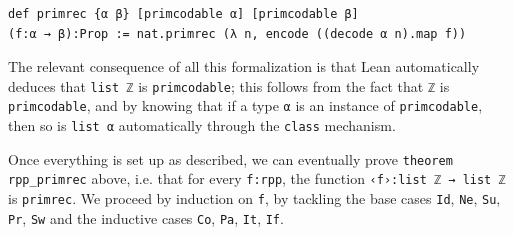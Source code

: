 \documentclass[preprint]{elsarticle}
\theoremstyle{remark}
\newcommand{\MATHLIB}{\textsf{mathlib}\xspace}
\newcommand{\LEAN}{\textsf{Lean}\xspace}
\begin{document}
\begin{lstlisting}
def primrec {α β} [primcodable α] [primcodable β]
(f:α → β):Prop := nat.primrec (λ n, encode ((decode α n).map f))
\end{lstlisting}

The relevant consequence of all this formalization is that \LEAN automatically deduces that \lstinline|list ℤ| is \lstinline|primcodable|; this follows from the fact that \lstinline|ℤ| is \lstinline|primcodable|, and by knowing that if a type \lstinline|α| is an instance of \lstinline|primcodable|, then so is \lstinline|list α| automatically through the \lstinline|class| mechanism.

\vspace{\baselineskip}
Once everything is set up as described, we can eventually prove \lstinline|theorem rpp_primrec| above, i.e.\@
that for every \lstinline|f:rpp|, the function \lstinline|‹f›:list ℤ → list ℤ| is \lstinline|primrec|. We proceed by induction on \lstinline|f|, by tackling the base cases \lstinline|Id|, \lstinline|Ne|, \lstinline|Su|, \lstinline|Pr|, \lstinline|Sw| and the inductive cases \lstinline|Co|, \lstinline|Pa|, \lstinline|It|, \lstinline|If|.


\end{document}
